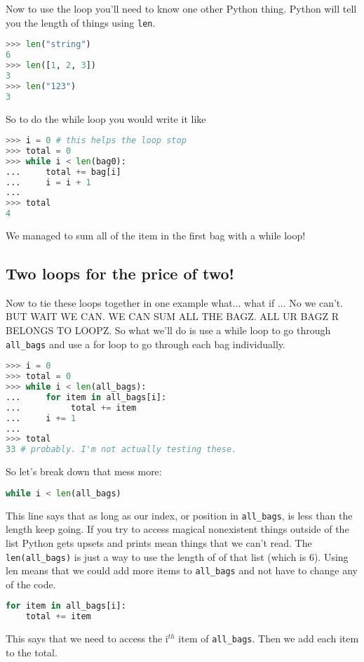 \documentclass{article}
\begin{document}
Now to use the loop you'll need to know one other Python thing. 
Python will tell you the length of things using \verb|len|.
\begin{lstlisting}[language=Python]
>>> len("string")
6
>>> len([1, 2, 3])
3
>>> len("123")
3
\end{lstlisting}

So to do the while loop you would write it like 
\begin{lstlisting}[language=Python]
>>> i = 0 # this helps the loop stop
>>> total = 0
>>> while i < len(bag0):
...     total += bag[i]
...     i = i + 1
...
>>> total
4
\end{lstlisting}

We managed to sum all of the item in the first bag with a while loop!

\subsection{Two loops for the price of two!}
Now to tie these loops together in one example what... what if ... No we can't.
BUT WAIT WE CAN. 
WE CAN SUM ALL THE BAGZ. 
ALL UR BAGZ R BELONGS TO LOOPZ.
So what we'll do is use a while loop to go through \verb|all_bags| and use a for loop to 
go through each bag individually.
\begin{lstlisting}[language=Python]
>>> i = 0
>>> total = 0
>>> while i < len(all_bags):
...     for item in all_bags[i]:
...          total += item
...     i += 1
...
>>> total
33 # probably. I'm not actually testing these.
\end{lstlisting}

So let's break down that mess more:
\begin{lstlisting}[language=Python]
while i < len(all_bags)
\end{lstlisting}
This line says that as long as our index, or position in \verb|all_bags|, is less than the length keep going. 
If you try to access magical nonexistent things outside of the list Python gets upsets and prints mean 
things that we can't read. 
The \verb|len(all_bags)| is just a way to use the length of of that list (which is 6). 
Using len means that we could add more items to \verb|all_bags| and not have to change any of the code. 

\begin{lstlisting}[language=Python]
for item in all_bags[i]:
    total += item
\end{lstlisting}

This says that we need to access the i\(^{th}\) item of \verb|all_bags|.
Then we add each item to the total.
\end{document}
